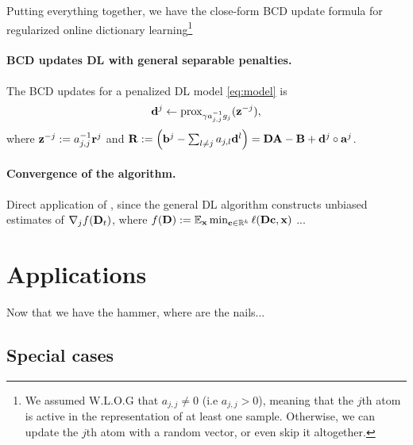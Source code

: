 Putting everything together, we have the close-form BCD update formula for regularized online dictionary learning\footnote{We assumed W.L.O.G that $a_{j,j} \ne 0$ (i.e $a_{j,j} > 0$), meaning that the $j$th atom is active in the representation of at least one sample. Otherwise, we can update the $j$th atom with a random vector, or even skip it altogether.}
\begin{shaded}
  \paragraph{BCD updates DL with general separable penalties.}
  The BCD updates for a penalized DL model \eqref{eq:model} is
\begin{equation}
  \mathbf{d}^j \leftarrow \operatorname{prox}_{\gamma a_{j,j}^{-1}g_j}(\mathbf{z}^{-j}),
\end{equation}
where $\mathbf{z}^{-j} := a_{j,j}^{-1}\mathbf{r}^j$ and $\mathbf{R} := \left(\mathbf{b}^j-\sum\nolimits_{l \ne j}a_{j,l}\mathbf{d}^l\right) = \mathbf{DA} - \mathbf{B} + \mathbf{d}^j \circ \mathbf{a}^j $.
\end{shaded}

\paragraph{Convergence of the algorithm.}
Direct application of \cite{fercoq2015}, since the general DL algorithm constructs unbiased
estimates of $\nabla_j f(\mathbf{D}_t)$, where $f(\mathbf{D}) := \mathbb E_{\mathbf{x}}\min_{\mathbf{c} \in \mathbb R^k}\ell (\mathbf{D}\mathbf{c}, \mathbf{x})$ ...

\section{Applications}
Now that we have the hammer, where are the nails...
\subsection{Special cases}
